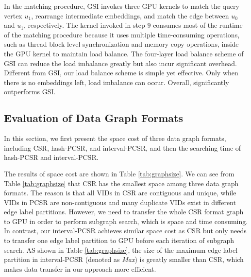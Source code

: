 In the matching procedure, GSI invokes three GPU kernels to match the query vertex $u_1$, rearrange intermediate embeddings, and
      match the edge between $u_0$ and $u_1$, respectively. The kernel invoked in step 9 consumes most of the runtime of the matching
      procedure because it uses multiple time-consuming operations, such as thread block level synchronization and memory copy
      operations, inside the GPU kernel to maintain load balance. The four-layer load balance scheme of GSI can reduce the load imbalance
      greatly but also incur significant overhead. Different from GSI, our load balance scheme is simple yet effective. Only when there
      is no embeddings left, load imbalance can occur. Overall, \SystemName significantly outperforms GSI. 







\subsection{Evaluation of Data Graph Formats\label{sec:evalgraphformat}}
In this section, we first present the space cost of three data graph formats, including CSR, hash-PCSR, and  interval-PCSR, and then the searching time of hash-PCSR and interval-PCSR.

The results of space cost are shown in Table \ref{tab:graphsize}. We can see from Table \ref{tab:graphsize} that CSR has the smallest space among three data graph formats. The reason is that all VIDs in CSR are contiguous and unique, while VIDs in PCSR are non-contiguous and many duplicate VIDs exist in different edge label partitions. However, we need to transfer the whole CSR format graph to GPU in order to perform subgraph search, which is space and time consuming. In contrast, our interval-PCSR achieves similar space cost as CSR but only needs to transfer one edge label partition to GPU before each iteration of subgraph search. AS shown in Table \ref{tab:graphsize}, the size of the maximum edge label partition in interval-PCSR (denoted as \emph{Max}) is greatly smaller than CSR, which makes data transfer in our approach more efficient.


